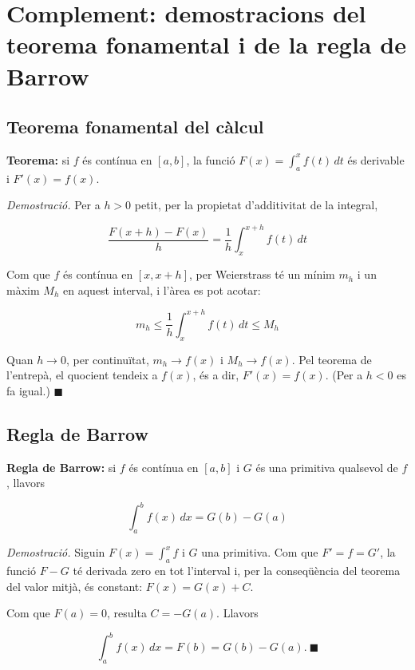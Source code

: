 \section{Complement: demostracions del teorema fonamental i de la regla de Barrow}

\subsection{Teorema fonamental del càlcul}

\textbf{Teorema:} si $f$ és contínua en $[a,b]$, la funció $F(x)=\displaystyle\int_a^x f(t)\,dt$ és derivable i $F'(x)=f(x)$.

\emph{Demostració.} Per a $h>0$ petit, per la propietat d'additivitat de la integral,

\begin{equation*}
\frac{F(x+h)-F(x)}{h}=\frac1h\int_x^{x+h}f(t)\,dt
\end{equation*}

Com que $f$ és contínua en $[x,x+h]$, per Weierstrass té un mínim $m_h$ i un màxim $M_h$ en aquest interval, i l'àrea es pot acotar:

\begin{equation*}
m_h\le\frac1h\int_x^{x+h}f(t)\,dt\le M_h
\end{equation*}

Quan $h\to0$, per continuïtat, $m_h\to f(x)$ i $M_h\to f(x)$. Pel teorema de l'entrepà, el quocient tendeix a $f(x)$, és a dir, $F'(x)=f(x)$. (Per a $h<0$ es fa igual.) $\blacksquare$

\subsection{Regla de Barrow}

\textbf{Regla de Barrow:} si $f$ és contínua en $[a,b]$ i $G$ és una primitiva qualsevol de $f$, llavors

\begin{equation}
\int_a^b f(x)\,dx=G(b)-G(a)
\end{equation}

\emph{Demostració.} Siguin $F(x)=\int_a^x f$ i $G$ una primitiva. Com que $F'=f=G'$, la funció $F-G$ té derivada zero en tot l'interval i, per la conseqüència del teorema del valor mitjà, és constant: $F(x)=G(x)+C$.

Com que $F(a)=0$, resulta $C=-G(a)$. Llavors

\begin{equation*}
\int_a^b f(x)\,dx=F(b)=G(b)-G(a).\ \blacksquare
\end{equation*}

